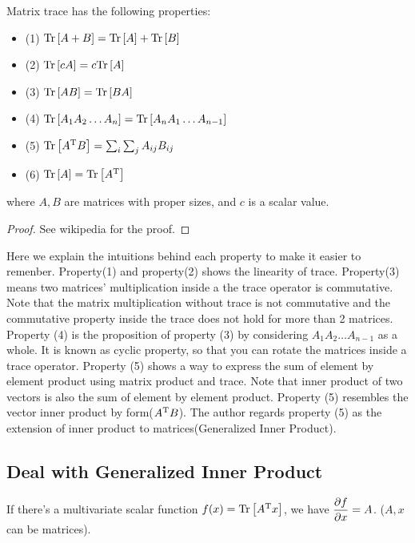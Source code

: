 \begin{mythm}
\label{thm:trace_prop}
Matrix trace has the following properties:
\begin{itemize}
	\item (1) $\mathrm{Tr}\left[A+B\right] = \mathrm{Tr}\left[A\right] + \mathrm{Tr}\left[B\right]$
	\item (2) $\mathrm{Tr}\left[cA\right] = c \mathrm{Tr}\left[A\right]$
	\item (3) $\mathrm{Tr}\left[AB\right] = \mathrm{Tr}\left[BA\right]$
	\item (4) $\mathrm{Tr}\left[A_1A_2 \ldots A_n\right]=\mathrm{Tr}\left[A_nA_1 \ldots A_{n-1}\right]$
	\item (5) $\mathrm{Tr}\left[A^\mathrm{T}B\right] = \sum_{i}\sum_{j}{A_{ij}B_{ij}}$
	\item (6) $\mathrm{Tr}\left[A\right] = \mathrm{Tr}\left[A^\mathrm{T}\right]$
\end{itemize}
where $A,B$ are matrices with proper sizes, and $c$ is a scalar value. 
\end{mythm}

\begin{proof}
See wikipedia \cite{wiki_trace} for the proof. 
\end{proof}

Here we explain the intuitions behind each property
to make it easier to remenber. Property(1)
and property(2) shows the linearity of trace. 
Property(3) means two matrices' multiplication inside a 
the trace operator is commutative. Note that the matrix 
multiplication without trace is not commutative and 
the commutative property inside the trace does not hold 
for more than 2 matrices. Property (4) is the proposition of 
property (3) by considering $A_1A_2 \ldots A_{n-1}$ 
as a whole. It is known as cyclic property, so that you can 
rotate the matrices inside a trace operator. Property (5) 
shows a way to express the sum of element by element product using 
matrix product and trace. Note that inner product of two vectors 
is also the sum of element by element product. Property (5) 
resembles the vector inner product by form($A^\mathrm{T}B$). 
The author regards property (5) as the extension of inner product 
to matrices(Generalized Inner Product). 

\subsection{Deal with Generalized Inner Product}

\begin{mythm}
	\label{thm:gip}
	If there's a multivariate scalar function $f(x) = \mathrm{Tr}\left[A^\mathrm{T}x\right]$, 
	we have $\dfrac{\partial f}{\partial x} = A$. ($A,x$ can be matrices). 
\end{mythm}

